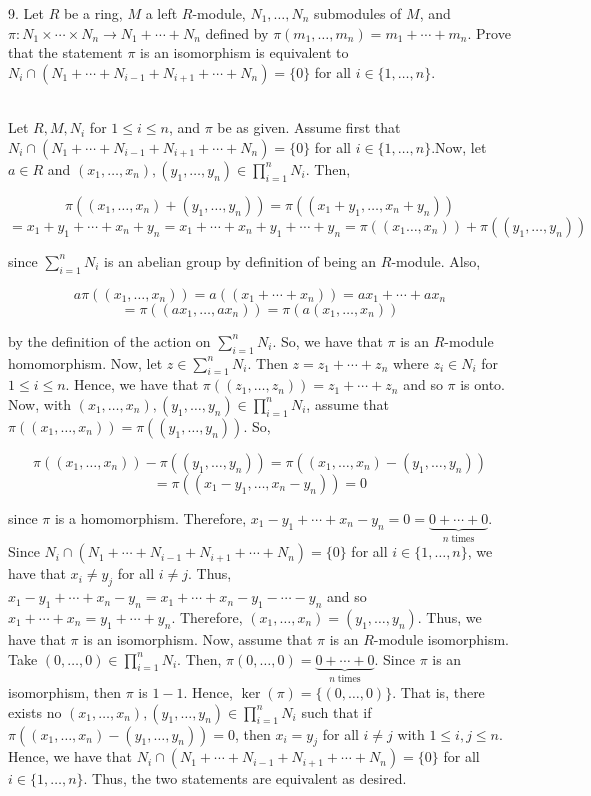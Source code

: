 9. Let $R$ be a ring, $M$ a left $R$-module, $N_1,\ldots, N_n$ submodules of $M$, and
$\pi:N_1\times\cdots\times N_n\rightarrow N_1+\cdots+N_n$ defined by
$\pi(m_1,\ldots,m_n)=m_1+\cdots+m_n$. Prove that the statement $\pi$ is an isomorphism is equivalent
to $N_i\cap(N_1+\cdots+N_{i-1}+N_{i+1}+\cdots+N_n)=\{0\}$ for all $i\in\{1,\ldots,n\}$.

\begin{solution}\renewcommand{\qedsymbol}{}\ \\
    Let $R, M, N_i$ for $1\leq i\leq n$, and $\pi$ be as given. Assume first that
    $N_i\cap(N_1+\cdots+N_{i-1}+N_{i+1}+\cdots+N_n)=\{0\}$ for all $i\in\{1,\ldots,n\}$.Now, let
    $a\in R$ and $(x_1,\ldots,x_n),(y_1,\ldots,y_n)\in\prod_{i=1}^nN_i$. Then,
    
    $$\pi((x_1,\ldots,x_n)+(y_1,\ldots,y_n))=\pi((x_1+y_1,\ldots,x_n+y_n))$$
    $$=x_1+y_1+\cdots+x_n+y_n=x_1+\cdots+x_n+y_1+\cdots+y_n=\pi((x_1\ldots,x_n))+\pi((y_1,\ldots,y_n))$$

    since $\sum_{i=1}^nN_i$ is an abelian group by definition of being an $R$-module. Also,

    $$a\pi((x_1,\ldots,x_n))=a((x_1+\cdots+x_n))=ax_1+\cdots+ax_n$$
    $$=\pi((ax_1,\ldots,ax_n))=\pi(a(x_1,\ldots,x_n))$$
    
    by the definition of the action on $\sum_{i=1}^nN_i$. So, we have that $\pi$ is an $R$-module
    homomorphism. Now, let $z\in\sum_{i=1}^nN_i$. Then $z=z_1+\cdots+z_n$ where $z_i\in N_i$ for
    $1\leq i\leq n$. Hence, we have that $\pi((z_1,\ldots,z_n))=z_1+\cdots+z_n$ and so $\pi$ is onto.
    Now, with $(x_1,\ldots,x_n),(y_1,\ldots,y_n)\in\prod_{i=1}^nN_i$, assume that
    $\pi((x_1,\ldots,x_n))=\pi((y_1,\ldots,y_n))$. So,

    $$\pi((x_1,\ldots,x_n))-\pi((y_1,\ldots,y_n))=\pi((x_1,\ldots,x_n)-(y_1,\ldots,y_n))$$
    $$=\pi((x_1-y_1,\ldots,x_n-y_n))=0$$

    since $\pi$ is a homomorphism. Therefore,
    $x_1-y_1+\cdots+x_n-y_n=0=\underbrace{0+\cdots+0}_{n\;\text{times}}$. Since
    $N_i\cap(N_1+\cdots+N_{i-1}+N_{i+1}+\cdots+N_n)=\{0\}$ for all $i\in\{1,\ldots,n\}$, we have that
    $x_i\neq y_j$ for all $i\neq j$. Thus, $x_1-y_1+\cdots+x_n-y_n=x_1+\cdots+x_n-y_1-\cdots-y_n$ and so
    $x_1+\cdots+x_n=y_1+\cdots+y_n$. Therefore, $(x_1,\ldots,x_n)=(y_1,\ldots,y_n)$. Thus, we have that
    $\pi$ is an isomorphism. Now, assume that $\pi$ is an $R$-module isomorphism. Take
    $(0,\ldots,0)\in\prod_{i=1}^nN_i$. Then,
    $\pi(0,\ldots,0)=\underbrace{0+\cdots+0}_{n\;\text{times}}$.
    Since $\pi$ is an isomorphism, then $\pi$ is $1-1$. Hence, $\ker(\pi)=\{(0,\ldots,0)\}$. That is,
    there exists no $(x_1,\ldots,x_n),(y_1,\ldots,y_n)\in\prod_{i=1}^nN_i$ such that if
    $\pi((x_1,\ldots,x_n)-(y_1,\ldots,y_n))=0$, then $x_i=y_j$ for all $i\neq j$ with $1\leq i,j\leq n$.
    Hence, we have that $N_i\cap(N_1+\cdots+N_{i-1}+N_{i+1}+\cdots+N_n)=\{0\}$ for all
    $i\in\{1,\ldots,n\}$. Thus, the two statements are equivalent as desired.

\end{solution}
